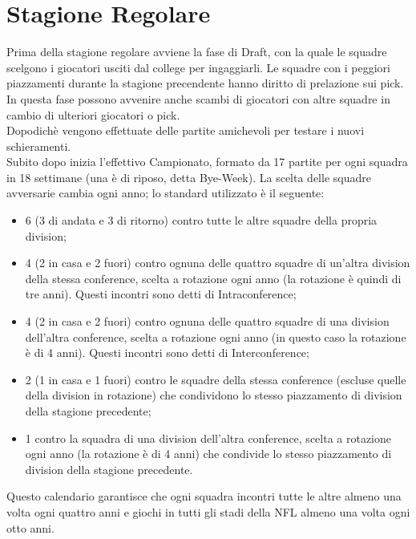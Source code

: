 \documentclass[a4paper, 12pt, oneside]{book}
\begin{document}
	\section{Stagione Regolare}
	Prima della stagione regolare avviene la fase di Draft, con la quale le squadre scelgono i giocatori usciti dal college per ingaggiarli. Le squadre con i peggiori piazzamenti durante la stagione precendente hanno diritto di prelazione sui pick. In questa fase possono avvenire anche scambi di giocatori con altre squadre in cambio di ulteriori giocatori o pick.
	\\Dopodichè vengono effettuate delle partite amichevoli per testare i nuovi schieramenti.
	\\Subito dopo inizia l'effettivo Campionato, formato da 17 partite per ogni squadra in 18 settimane (una è di riposo, detta Bye-Week). La scelta delle squadre avversarie cambia ogni anno; lo standard utilizzato è il seguente:
	\begin{itemize}
		\item 6 (3 di andata e 3 di ritorno) contro tutte le altre squadre della propria division;
		\item 4 (2 in casa e 2 fuori) contro ognuna delle quattro squadre di un'altra division della stessa conference, scelta a rotazione ogni anno (la rotazione è quindi di tre anni). Questi incontri sono detti di Intraconference;
		\item 4 (2 in casa e 2 fuori) contro ognuna delle quattro squadre di una division dell'altra conference, scelta a rotazione ogni anno (in questo caso la rotazione è di 4 anni). Questi incontri sono detti di Interconference;
		\item 2 (1 in casa e 1 fuori) contro le squadre della stessa conference (escluse quelle della division in rotazione) che condividono lo stesso piazzamento di division della stagione precedente;
		\item 1 contro la squadra di una division dell'altra conference, scelta a rotazione ogni anno (la rotazione è di 4 anni) che condivide lo stesso piazzamento di division della stagione precedente.
	\end{itemize}
	Questo calendario garantisce che ogni squadra incontri tutte le altre almeno una volta ogni quattro anni e giochi in tutti gli stadi della NFL almeno una volta ogni otto anni.
	
\end{document}
